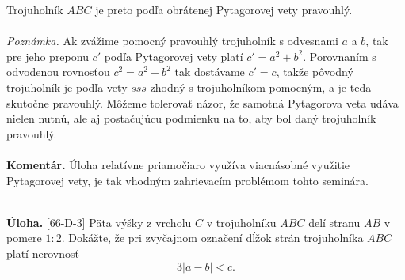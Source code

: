 \documentclass[11pt,a4paper,oneside,final]{book}
\newcommand{\kom}{\textbf{Komentár.} }
\newcommand{\ul}{\textbf{Úloha.} }
\begin{document}
Trojuholník $ABC$ je preto podľa obrátenej Pytagorovej vety pravouhlý.\\
\\
\textit{Poznámka.} Ak zvážime pomocný pravouhlý trojuholník s odvesnami $a$ a $b$, tak pre jeho preponu $c'$ podľa Pytagorovej vety platí $c' = a^2 + b^2$. Porovnaním s odvodenou rovnosťou $c^2 = a^2 + b^2$ tak dostávame $c'= c$, takže pôvodný trojuholník je podľa vety $sss$ zhodný s trojuholníkom pomocným, a je teda skutočne pravouhlý. Môžeme tolerovať názor, že samotná Pytagorova veta udáva nielen nutnú, ale aj postačujúcu podmienku na to, aby bol daný trojuholník pravouhlý.\\
\\
\kom Úloha relatívne priamočiaro využíva viacnásobné využitie Pytagorovej vety, je tak vhodným zahrievacím problémom tohto seminára.\\
\\
\begin{tcolorbox}[breakable,notitle,boxrule=0pt,colback=light-gray,colframe=light-gray]\ul [66-D-3]
Päta výšky z vrcholu $C$ v trojuholníku $ABC$ delí stranu $AB$ v pomere $1 : 2$. Dokážte, že pri zvyčajnom označení dĺžok strán trojuholníka $ABC$ platí nerovnosť $$3|a - b| < c.$$
\end{tcolorbox}
\end{document}

